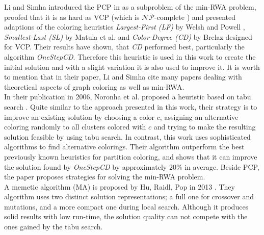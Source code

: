 Li and Simha introduced the PCP in \cite{li-00} as a subproblem of the min-RWA problem, proofed that it is as hard as VCP (which is $\mathcal{NP}$-complete \cite{karp-72}) and presented adaptions of the coloring heuristics \textit{Largest-First (LF)} by Welsh and Powell \cite{welsh-67}, \textit{Smallest-Last (SL)} by Matula et al. \cite{matula-72} and \textit{Color-Degree (CD)} by Brelaz \cite{brelaz-79} designed for VCP. Their results have shown, that \textit{CD} performed best, particularly the algorithm \textit{OneStepCD}. Therefore this heuristic is used in this work to create the initial solution and with a slight variation it is also used to improve it. It is worth to mention that in their paper, Li and Simha cite many papers dealing with theoretical aspects of graph coloring as well as min-RWA.\\
In their publication in 2006, Noronha et al. proposed a heuristic based on tabu search \cite{noronha-06}. Quite similar to the approach presented in this work, their strategy is to improve an existing solution by choosing a color $c$, assigning an alternative coloring randomly to all clusters colored with $c$ and trying to make the resulting solution feasible by using tabu search. In contrast, this work uses sophisticated algorithms to find alternative colorings. Their algorithm outperform the best previously known heuristics for partition coloring, and shows that it can improve the solution found by \textit{OneStepCD} by approximately 20\% in average. Beside PCP, the paper proposes  strategies for solving the min-RWA problem.\\
A memetic algorithm (MA) is proposed by Hu, Raidl, Pop in 2013 \cite{pop-12}. They algorithm uses two distinct solution representations; a full one for crossover and mutations, and a more compact one during local search. Although it produces solid results with low run-time, the solution quality can not compete with the ones gained by the tabu search.

